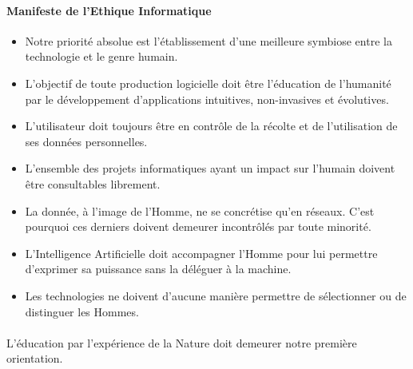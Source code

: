 \paragraph{Manifeste de l'Ethique Informatique}

\begin{itemize}
    \item Notre priorité absolue est l'établissement d'une
    meilleure symbiose entre la technologie et le genre humain.

    \item L'objectif de toute production logicielle doit être
    l'éducation de l'humanité par le développement
    d'applications intuitives, non-invasives et évolutives.

    \item L'utilisateur doit toujours être en contrôle de la
    récolte et de l'utilisation de ses données personnelles.

    \item L'ensemble des projets informatiques ayant un impact
    sur l'humain doivent être consultables librement.

    \item La donnée, à l'image de l'Homme, ne se concrétise qu'en
    réseaux. C'est pourquoi ces derniers doivent demeurer incontrôlés 
    par toute minorité.

    \item L'Intelligence Artificielle doit accompagner l'Homme pour
    lui permettre d'exprimer sa puissance sans la déléguer
    à la machine.

    \item Les technologies ne doivent d'aucune manière permettre de 
    sélectionner ou de distinguer les Hommes.
\end{itemize}

\paragraph{} L'éducation par l'expérience de la Nature doit
demeurer notre première orientation.
